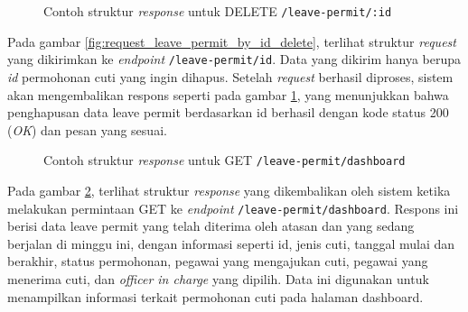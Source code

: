 \begin{figure}
    \centering
    \caption{Contoh struktur \textit{response} untuk DELETE \texttt{/leave-permit/{:id}}}
    \label{fig:response_leave_permit_by_id_get}
\end{figure}

Pada gambar \ref{fig:request_leave_permit_by_id_delete}, terlihat struktur \textit{request} yang dikirimkan ke \textit{endpoint} \texttt{/leave-permit/{id}}. Data yang dikirim hanya berupa \textit{id} permohonan cuti yang ingin dihapus. Setelah \textit{request} berhasil diproses, sistem akan mengembalikan respons seperti pada gambar \ref{fig:response_leave_permit_by_id_get}, yang menunjukkan bahwa penghapusan data leave permit berdasarkan id berhasil dengan kode status 200 (\textit{OK}) dan pesan yang sesuai.


\begin{figure}
    \centering
    \caption{Contoh struktur \textit{response} untuk GET \texttt{/leave-permit/dashboard}}
    \label{fig:response_leave_permit_dashboard_get}
\end{figure}
Pada gambar \ref{fig:response_leave_permit_dashboard_get}, terlihat struktur \textit{response} yang dikembalikan oleh sistem ketika melakukan permintaan GET ke \textit{endpoint} \texttt{/leave-permit/dashboard}. Respons ini berisi data leave permit yang telah diterima oleh atasan dan yang sedang berjalan di minggu ini, dengan informasi seperti id, jenis cuti, tanggal mulai dan berakhir, status permohonan, pegawai yang mengajukan cuti, pegawai yang menerima cuti, dan \textit{officer in charge} yang dipilih. Data ini digunakan untuk menampilkan informasi terkait permohonan cuti pada halaman dashboard.



